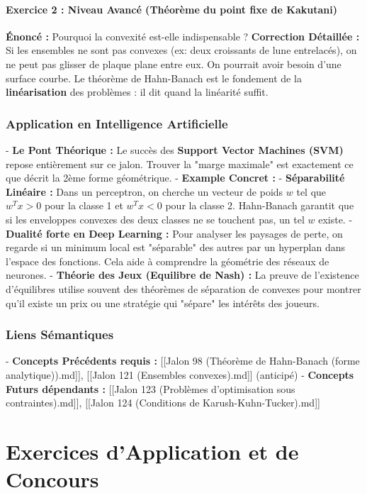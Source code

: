 \documentclass[11pt,a4paper]{article}
\begin{document}
\subsection{Exercice 2 : Niveau Avancé (Théorème du point fixe de Kakutani)}
\textbf{Énoncé :} Pourquoi la convexité est-elle indispensable ?
\textbf{Correction Détaillée :}
Si les ensembles ne sont pas convexes (ex: deux croissants de lune entrelacés), on ne peut pas glisser de plaque plane entre eux. On pourrait avoir besoin d'une surface courbe. Le théorème de Hahn-Banach est le fondement de la \textbf{linéarisation} des problèmes : il dit quand la linéarité suffit.

\section{Application en Intelligence Artificielle}

- \textbf{Le Pont Théorique :} Le succès des \textbf{Support Vector Machines (SVM)} repose entièrement sur ce jalon. Trouver la "marge maximale" est exactement ce que décrit la 2ème forme géométrique.
- \textbf{Example Concret :}
    - \textbf{Séparabilité Linéaire :} Dans un perceptron, on cherche un vecteur de poids $w$ tel que $w^T x > 0$ pour la classe 1 et $w^T x < 0$ pour la classe 2. Hahn-Banach garantit que si les enveloppes convexes des deux classes ne se touchent pas, un tel $w$ existe.
    - \textbf{Dualité forte en Deep Learning :} Pour analyser les paysages de perte, on regarde si un minimum local est "séparable" des autres par un hyperplan dans l'espace des fonctions. Cela aide à comprendre la géométrie des réseaux de neurones.
    - \textbf{Théorie des Jeux (Equilibre de Nash) :} La preuve de l'existence d'équilibres utilise souvent des théorèmes de séparation de convexes pour montrer qu'il existe un prix ou une stratégie qui "sépare" les intérêts des joueurs.

\section{Liens Sémantiques}

- \textbf{Concepts Précédents requis :} [[Jalon 98 (Théorème de Hahn-Banach (forme analytique)).md]], [[Jalon 121 (Ensembles convexes).md]] (anticipé)
- \textbf{Concepts Futurs dépendants :} [[Jalon 123 (Problèmes d'optimisation sous contraintes).md]], [[Jalon 124 (Conditions de Karush-Kuhn-Tucker).md]]


\part{Exercices d'Application et de Concours}
\end{document}
